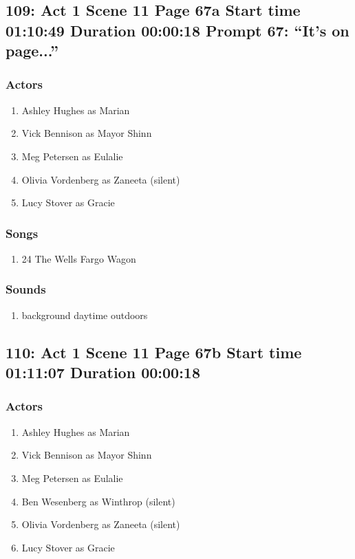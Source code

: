 \subsection{109: Act 1 Scene 11 Page 67a Start time 01:10:49 Duration 00:00:18 Prompt 67: ``It's on page...''}

\subsubsection{Actors}
\begin{enumerate}
\item Ashley Hughes as Marian
\item Vick Bennison as Mayor Shinn
\item Meg Petersen as Eulalie
\item Olivia Vordenberg as Zaneeta (silent)
\item Lucy Stover as Gracie
\end{enumerate}

\subsubsection{Songs}
\begin{enumerate}
\item 24 The Wells Fargo Wagon
\end{enumerate}\subsubsection{Sounds}
\begin{enumerate}
\item background daytime outdoors
\end{enumerate}
\subsection{110: Act 1 Scene 11 Page 67b Start time 01:11:07 Duration 00:00:18}

\subsubsection{Actors}
\begin{enumerate}
\item Ashley Hughes as Marian
\item Vick Bennison as Mayor Shinn
\item Meg Petersen as Eulalie
\item Ben Wesenberg as Winthrop (silent)
\item Olivia Vordenberg as Zaneeta (silent)
\item Lucy Stover as Gracie
\end{enumerate}
